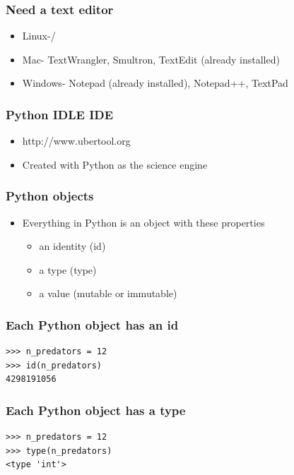 \documentclass{beamer}
\begin{document}
\begin{frame}[fragile]
\frametitle{Need a text editor}
\begin{itemize}
  \item{Linux-/}
  \item{Mac- TextWrangler, Smultron, TextEdit (already installed)}
  \item{Windows- Notepad (already installed), Notepad++, TextPad}
\end{itemize} 
\end{frame}

\begin{frame}[fragile]
\frametitle{Python IDLE IDE}
\begin{itemize}
  \item{http://www.ubertool.org}
  \item{Created with Python as the science engine}
\end{itemize} 
\end{frame}

\begin{frame}[fragile]
\frametitle{Python objects}
\begin{itemize}
\item Everything in Python is an object with these properties
\begin{itemize}  
  \item an identity (id) 
  \item a type (type)
  \item a value (mutable or immutable)
\end{itemize}
\end{itemize} 
\end{frame}

\begin{frame}[fragile]
\frametitle{Each Python object has an id}
\begin{lstlisting}
>>> n_predators = 12
>>> id(n_predators)
4298191056
\end{lstlisting} 
\end{frame}

\begin{frame}[fragile]
\frametitle{Each Python object has a type}
\begin{lstlisting}
>>> n_predators = 12
>>> type(n_predators)
<type 'int'>
\end{lstlisting}
\end{frame}
\end{document}
